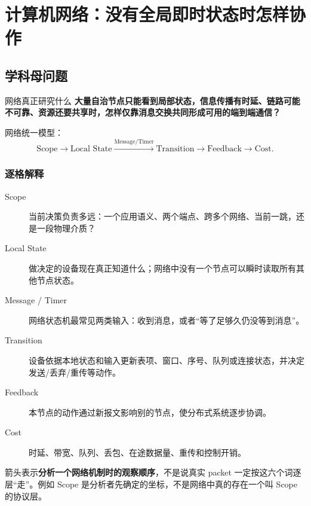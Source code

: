 \documentclass[11pt,a4paper,openany]{ctexbook}
\newcommand{\key}[1]{\textbf{\color{deep}#1}}
\begin{document}
\chapter{计算机网络：没有全局即时状态时怎样协作}

\section{学科母问题}
\begin{corebox}{网络真正研究什么}
\key{大量自治节点只能看到局部状态，信息传播有时延、链路可能不可靠、资源还要共享时，怎样仅靠消息交换共同形成可用的端到端通信？}
\end{corebox}

网络统一模型：
\[
\boxed{\text{Scope}\rightarrow\text{Local State}\xrightarrow{\text{Message/Timer}}\text{Transition}\rightarrow\text{Feedback}\rightarrow\text{Cost}}.
\]

\subsection{逐格解释}
\begin{description}
  \item[Scope] 当前决策负责多远：一个应用语义、两个端点、跨多个网络、当前一跳，还是一段物理介质？
  \item[Local State] 做决定的设备现在真正知道什么；网络中没有一个节点可以瞬时读取所有其他节点状态。
  \item[Message / Timer] 网络状态机最常见两类输入：收到消息，或者“等了足够久仍没等到消息”。
  \item[Transition] 设备依据本地状态和输入更新表项、窗口、序号、队列或连接状态，并决定发送/丢弃/重传等动作。
  \item[Feedback] 本节点的动作通过新报文影响别的节点，使分布式系统逐步协调。
  \item[Cost] 时延、带宽、队列、丢包、在途数据量、重传和控制开销。
\end{description}
箭头表示\key{分析一个网络机制时的观察顺序}，不是说真实 packet 一定按这六个词逐层“走”。例如 Scope 是分析者先确定的坐标，不是网络中真的存在一个叫 Scope 的协议层。
\end{document}

